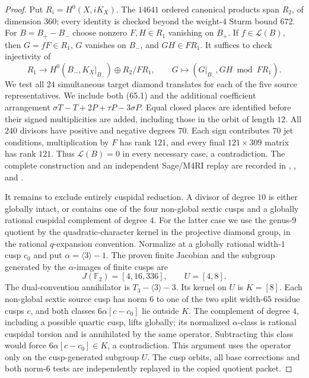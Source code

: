 \begin{proof}
Put $R_i=H^0(X,iK_X)$. The $14641$ ordered canonical products span
$R_2$, of dimension $360$; every identity is checked beyond the
weight-$4$ Sturm bound $672$. For $B=B_+-B_-$ choose nonzero
$F,H\in R_1$ vanishing on $B_+$. If $f\in\mathcal L(B)$, then
$G=fF\in R_1$, $G$ vanishes on $B_-$, and $GH\in FR_1$.
It suffices to check injectivity of
\[
 R_1\longrightarrow H^0(B_-,K_X|_{B_-})\oplus R_2/FR_1,
 \qquad G\longmapsto(G|_{B_-},GH\bmod FR_1).
\]
We test all $24$ simultaneous target diamond translates for each
of the five source representatives. We include both (65.1) and
the additional coefficient arrangement
$\sigma T-T+2P+\tau P-3\sigma P$.
Equal closed places are identified before their signed
multiplicities are added, including those in the orbit of length
$12$. All $240$ divisors have positive and negative degrees $70$.
Each sign contributes $70$ jet conditions, multiplication by $F$ has
rank $121$, and every final $121\times309$ matrix has rank $121$.
Thus $\mathcal L(B)=0$ in every necessary case, a contradiction.
The complete construction and an independent Sage/M4RI replay are
recorded in ,
,
 and
.

It remains to exclude entirely cuspidal reduction. A divisor of
degree $10$ is either globally intact, or contains one of the four
non-global sextic cusps and a globally rational cuspidal complement
of degree $4$. For the latter case we use the genus-$9$ quotient by
the quadratic-character kernel in the projective diamond group,
in the rational $q$-expansion convention. Normalize at a globally
rational width-$1$ cusp $c_0$ and put $\alpha=\langle3\rangle-1$.
The proven finite Jacobian and the subgroup generated by the
$\alpha$-images of finite cusps are
\[
 J(\mathbb F_2)=[4,16,336],\qquad U=[4,8].
\]
The dual-convention annihilator is $T_3-\langle3\rangle-3$.
Its kernel on $U$ is $K=[8]$. Each non-global sextic source cusp
has norm $6$ to one of the two split width-$65$ residue cusps $c$,
and both classes $6\alpha[c-c_0]$ lie outside $K$.
The complement of degree $4$, including a possible quartic cusp,
lifts globally; its normalized $\alpha$-class is rational cuspidal
torsion and is annihilated by the same operator. Subtracting this
class would force $6\alpha[c-c_0]\in K$, a contradiction. This
argument uses the operator only on the cusp-generated subgroup $U$.
The cusp orbits, all base corrections and both norm-$6$ tests are
independently replayed in the copied quotient packet.


\end{proof}
